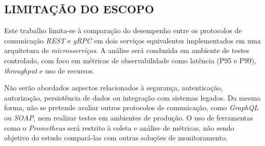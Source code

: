 \subsection{LIMITAÇÃO DO ESCOPO}

Este trabalho limita-se à comparação do desempenho entre os protocolos de comunicação \textit{REST} e \textit{gRPC} em dois serviços equivalentes implementados em uma arquitetura de \textit{microsserviços}. A análise será conduzida em ambiente de testes controlado, com foco em métricas de observabilidade como latência (P95 e P99), \textit{throughput} e uso de recursos.

Não serão abordados aspectos relacionados à segurança, autenticação, autorização, persistência de dados ou integração com sistemas legados. Da mesma forma, não se pretende avaliar outros protocolos de comunicação, como \textit{GraphQL} ou \textit{SOAP}, nem realizar testes em ambientes de produção. O uso de ferramentas como o \textit{Prometheus} será restrito à coleta e análise de métricas, não sendo objetivo do estudo compará-las com outras soluções de monitoramento.





